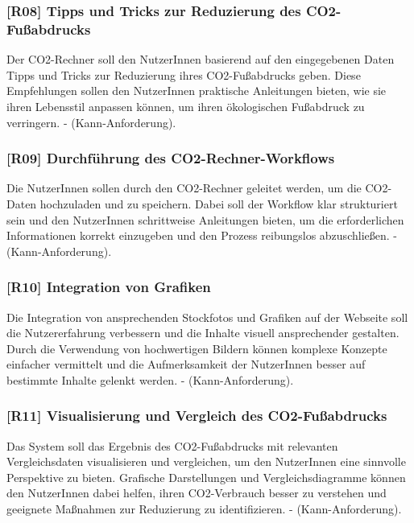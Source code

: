 \subsubsection{[R08] Tipps und Tricks zur Reduzierung des CO2-Fußabdrucks}

Der CO2-Rechner soll den NutzerInnen basierend auf den eingegebenen Daten Tipps und Tricks zur Reduzierung ihres CO2-Fußabdrucks geben. Diese Empfehlungen sollen den NutzerInnen praktische Anleitungen bieten, wie sie ihren Lebensstil anpassen können, um ihren ökologischen Fußabdruck zu verringern. - (Kann-Anforderung).

\subsubsection{[R09] Durchführung des CO2-Rechner-Workflows}

Die NutzerInnen sollen durch den CO2-Rechner geleitet werden, um die CO2-Daten hochzuladen und zu speichern. Dabei soll der Workflow klar strukturiert sein und den NutzerInnen schrittweise Anleitungen bieten, um die erforderlichen Informationen korrekt einzugeben und den Prozess reibungslos abzuschließen. - (Kann-Anforderung).

\subsubsection{[R10] Integration von Grafiken}

Die Integration von ansprechenden Stockfotos und Grafiken auf der Webseite soll die Nutzererfahrung verbessern und die Inhalte visuell ansprechender gestalten. Durch die Verwendung von hochwertigen Bildern können komplexe Konzepte einfacher vermittelt und die Aufmerksamkeit der NutzerInnen besser auf bestimmte Inhalte gelenkt werden. - (Kann-Anforderung).

\subsubsection{[R11] Visualisierung und Vergleich des CO2-Fußabdrucks}

Das System soll das Ergebnis des CO2-Fußabdrucks mit relevanten Vergleichsdaten visualisieren und vergleichen, um den NutzerInnen eine sinnvolle Perspektive zu bieten. Grafische Darstellungen und Vergleichsdiagramme können den NutzerInnen dabei helfen, ihren CO2-Verbrauch besser zu verstehen und geeignete Maßnahmen zur Reduzierung zu identifizieren. - (Kann-Anforderung).

